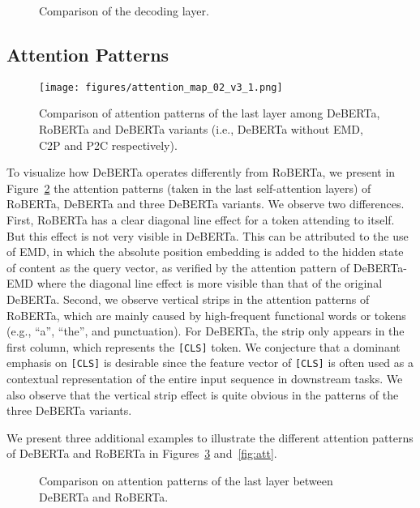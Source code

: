 \documentclass{article}
\newcommand\ModelName{DeBERTa}
\begin{document}
\begin{figure}[]
\centering  
{}
\hfill
{}

\caption{Comparison of the decoding layer.}
\label{fig:emd}
\end{figure}

\subsection{Attention Patterns}
\label{subsec:attention}


\begin{figure}[htb!]
\centering 
\texttt{[image: figures/attention\_map\_02\_v3\_1.png]}
\caption{Comparison  of attention patterns of the last layer among DeBERTa, RoBERTa and  DeBERTa variants (i.e., DeBERTa without EMD, C2P and P2C respectively). }
\label{fig:att-map}
\end{figure}

To visualize how DeBERTa operates differently from RoBERTa, we present in Figure~\ref{fig:att-map} the attention patterns (taken in the last self-attention layers) of RoBERTa, DeBERTa and three DeBERTa variants.
We observe two differences. 
First, RoBERTa has a clear diagonal line effect for a token  attending to itself. But this effect is not very visible in {\ModelName}. 
This can be attributed to the use of EMD, in which the absolute position embedding is added to the hidden state of content as the query vector,
as verified by the attention pattern of DeBERTa-EMD where the diagonal line effect is more visible  
than that of the original {\ModelName}. 
Second, we observe vertical strips in the attention patterns of RoBERTa, which are mainly caused by high-frequent functional words or tokens (e.g., ``a'', ``the'', and punctuation). 
For {\ModelName}, the strip only appears in the first column, which represents the \texttt{[CLS]} token. 
We conjecture that a dominant emphasis on \texttt{[CLS]} is desirable since the feature vector of \texttt{[CLS]} is often used as a contextual representation of the entire input sequence in downstream tasks. 
We also observe that the vertical strip effect is quite obvious in the patterns of the three {\ModelName} variants. 

We present three additional examples to illustrate the different attention patterns of {\ModelName} and RoBERTa in Figures~\ref{fig:att-01} and~\ref{fig:att}.  
\begin{figure}[htb!]
\centering 
{}
\vfill
{}
\vfill
{}
\caption{Comparison  on attention patterns of the last layer between DeBERTa and RoBERTa.   }
\label{fig:att-01}
\end{figure}
\end{document}
